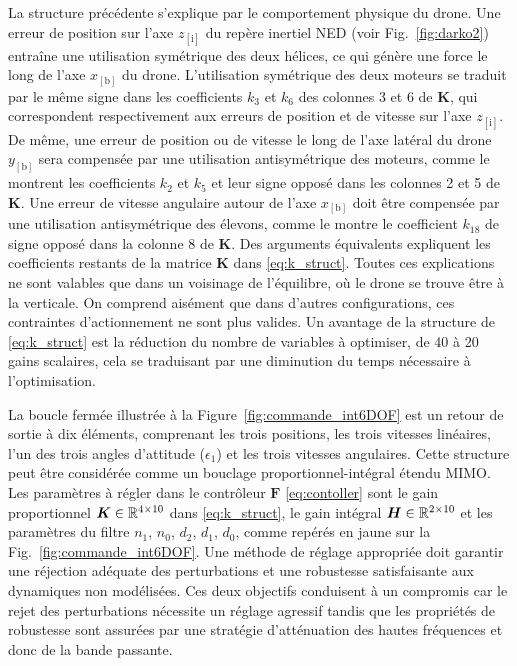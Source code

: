 La structure précédente s'explique par le comportement physique du drone. Une erreur de position sur l'axe $z_{[\text{i}]}$ du repère inertiel NED (voir Fig.~\ref{fig:darko2}) entraîne une utilisation symétrique des deux hélices, ce qui génère une force le long de l'axe $x_{[\text{b}]}$ du drone. L'utilisation symétrique des deux moteurs se traduit par le même signe dans les coefficients $k_{3}$ et $k_{6}$ des colonnes 3 et 6 de $\boldsymbol{K}$, qui correspondent respectivement aux erreurs de position et de vitesse sur l'axe $z_{[\text{i}]}$. De même, une erreur de position ou de vitesse le long de l'axe latéral du drone $y_{[\text{b}]}$ sera compensée par une utilisation antisymétrique des moteurs, comme le montrent les coefficients $k_{2}$ et $k_{5}$ et leur signe opposé dans les colonnes 2 et 5 de $\boldsymbol{K}$. Une erreur de vitesse angulaire autour de l'axe $x_{[\text{b}]}$ doit être compensée par une utilisation antisymétrique des élevons, comme le montre le coefficient $k_{18}$ de signe opposé dans la colonne 8 de $\boldsymbol{K}$. Des arguments équivalents expliquent les coefficients restants de la matrice $\boldsymbol{K}$ dans \eqref{eq:k_struct}. Toutes ces explications ne sont valables que dans un voisinage de l'équilibre, où le drone se trouve être à la verticale. On comprend aisément que dans d'autres configurations, ces contraintes d'actionnement ne sont plus valides. Un avantage de la structure de \eqref{eq:k_struct} est la réduction du nombre de variables à optimiser, de 40 à 20 gains scalaires, cela se traduisant par une diminution du temps nécessaire à l'optimisation.

La boucle fermée illustrée à la Figure~\ref{fig:commande_int6DOF} est un retour de sortie à dix éléments, comprenant les trois positions, les trois vitesses linéaires, l'un des trois angles d'attitude ($\epsilon_{1}$) et les trois vitesses angulaires. Cette structure peut être considérée comme un bouclage proportionnel-intégral étendu MIMO. Les paramètres à régler dans le contrôleur $\boldsymbol{F}$ \eqref{eq:contoller} sont le gain proportionnel $\boldsymbol{K} \in {\mathbb R}^{4\times10}$ dans \eqref{eq:k_struct}, le gain intégral $\boldsymbol{H} \in {\mathbb R}^{2\times10}$ et les paramètres du filtre $n_1$, $n_0$, $d_2$, $d_1$, $d_0$, comme repérés en jaune sur la Fig.~\ref{fig:commande_int6DOF}. Une méthode de réglage appropriée doit garantir une réjection adéquate des perturbations et une robustesse satisfaisante aux dynamiques non modélisées. Ces deux objectifs conduisent à un compromis car le rejet des perturbations nécessite un réglage agressif tandis que les propriétés de robustesse sont assurées par une stratégie d'atténuation des hautes fréquences et donc de la bande passante.

